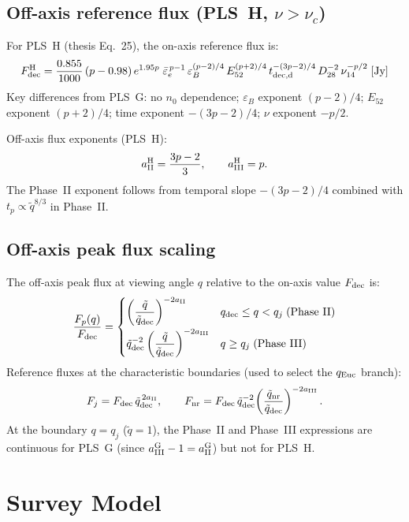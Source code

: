 \documentclass[11pt,a4paper]{article}
\begin{document}
\subsection{Off-axis reference flux (PLS~H, $\nu>\nu_c$)}

\noindent For PLS~H (thesis Eq.~25), the on-axis reference flux is:
\begin{equation}
F_{\rm dec}^{\rm H} = \frac{0.855}{1000}\,(p-0.98)\,e^{1.95p}\;
\bar{\varepsilon}_e^{\,p-1}\,\varepsilon_B^{(p-2)/4}\,
E_{52}^{(p+2)/4}\,
t_{\rm dec,d}^{-(3p-2)/4}\,D_{28}^{-2}\,\nu_{14}^{-p/2}
\;[\text{Jy}]
\end{equation}
Key differences from PLS~G: no $n_0$ dependence; $\varepsilon_B$ exponent $(p-2)/4$; $E_{52}$ exponent $(p+2)/4$; time exponent $-(3p-2)/4$; $\nu$ exponent $-p/2$.

\noindent Off-axis flux exponents (PLS~H):
\[
a_{\rm II}^{\rm H} = \frac{3p-2}{3}, \qquad a_{\rm III}^{\rm H} = p.
\]
The Phase~II exponent follows from temporal slope $-(3p-2)/4$ combined with $t_p\propto\tilde{q}^{8/3}$ in Phase~II.

\subsection{Off-axis peak flux scaling}

\noindent The off-axis peak flux at viewing angle $q$ relative to the on-axis value $F_{\rm dec}$ is:
\begin{equation}
\frac{F_p(q)}{F_{\rm dec}} = \begin{cases}
\left(\dfrac{\tilde{q}}{\tilde{q}_{\rm dec}}\right)^{-2a_{\rm II}} & q_{\rm dec}\le q<q_j\;\text{(Phase II)}\\[8pt]
\tilde{q}_{\rm dec}^{-2}\left(\dfrac{\tilde{q}}{\tilde{q}_{\rm dec}}\right)^{-2a_{\rm III}} & q\ge q_j\;\text{(Phase III)}
\end{cases}
\end{equation}
Reference fluxes at the characteristic boundaries (used to select the $q_{\rm Euc}$ branch):
\[
F_j = F_{\rm dec}\,\tilde{q}_{\rm dec}^{\,2a_{\rm II}},
\qquad
F_{\rm nr} = F_{\rm dec}\,\tilde{q}_{\rm dec}^{-2}\!\left(\frac{\tilde{q}_{\rm nr}}{\tilde{q}_{\rm dec}}\right)^{-2a_{\rm III}}.
\]
At the boundary $q=q_j$ ($\tilde{q}=1$), the Phase~II and Phase~III expressions are continuous for PLS~G (since $a_{\rm III}^{\rm G}-1=a_{\rm II}^{\rm G}$) but not for PLS~H.

\section{Survey Model}
\end{document}
